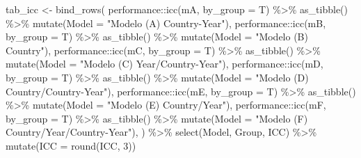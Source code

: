 \documentclass[
  12pt,
  a4paper,
]{article}
\newenvironment{Shaded}{\begin{snugshade}}{\end{snugshade}}
\newcommand{\AttributeTok}[1]{\textcolor[rgb]{0.77,0.63,0.00}{#1}}
\newcommand{\DecValTok}[1]{\textcolor[rgb]{0.00,0.00,0.81}{#1}}
\newcommand{\FunctionTok}[1]{\textcolor[rgb]{0.00,0.00,0.00}{#1}}
\newcommand{\NormalTok}[1]{#1}
\newcommand{\OtherTok}[1]{\textcolor[rgb]{0.56,0.35,0.01}{#1}}
\newcommand{\SpecialCharTok}[1]{\textcolor[rgb]{0.00,0.00,0.00}{#1}}
\newcommand{\StringTok}[1]{\textcolor[rgb]{0.31,0.60,0.02}{#1}}
\begin{document}
\begin{Shaded}
\begin{Highlighting}[]
\NormalTok{tab\_icc }\OtherTok{\textless{}{-}} \FunctionTok{bind\_rows}\NormalTok{(                                                 }
\NormalTok{performance}\SpecialCharTok{::}\FunctionTok{icc}\NormalTok{(mA, }\AttributeTok{by\_group =}\NormalTok{ T) }\SpecialCharTok{\%\textgreater{}\%} 
  \FunctionTok{as\_tibble}\NormalTok{() }\SpecialCharTok{\%\textgreater{}\%} 
  \FunctionTok{mutate}\NormalTok{(}\AttributeTok{Model =} \StringTok{"Modelo (A) Country{-}Year"}\NormalTok{),}
\NormalTok{performance}\SpecialCharTok{::}\FunctionTok{icc}\NormalTok{(mB, }\AttributeTok{by\_group =}\NormalTok{ T) }\SpecialCharTok{\%\textgreater{}\%} 
  \FunctionTok{as\_tibble}\NormalTok{() }\SpecialCharTok{\%\textgreater{}\%} 
  \FunctionTok{mutate}\NormalTok{(}\AttributeTok{Model =}  \StringTok{"Modelo (B) Country"}\NormalTok{),}
\NormalTok{performance}\SpecialCharTok{::}\FunctionTok{icc}\NormalTok{(mC, }\AttributeTok{by\_group =}\NormalTok{ T) }\SpecialCharTok{\%\textgreater{}\%} 
  \FunctionTok{as\_tibble}\NormalTok{() }\SpecialCharTok{\%\textgreater{}\%} 
  \FunctionTok{mutate}\NormalTok{(}\AttributeTok{Model =} \StringTok{"Modelo (C) Year/Country{-}Year"}\NormalTok{),}
\NormalTok{performance}\SpecialCharTok{::}\FunctionTok{icc}\NormalTok{(mD, }\AttributeTok{by\_group =}\NormalTok{ T) }\SpecialCharTok{\%\textgreater{}\%} 
  \FunctionTok{as\_tibble}\NormalTok{() }\SpecialCharTok{\%\textgreater{}\%} 
  \FunctionTok{mutate}\NormalTok{(}\AttributeTok{Model =} \StringTok{"Modelo (D) Country/Country{-}Year"}\NormalTok{),}
\NormalTok{performance}\SpecialCharTok{::}\FunctionTok{icc}\NormalTok{(mE, }\AttributeTok{by\_group =}\NormalTok{ T) }\SpecialCharTok{\%\textgreater{}\%} 
  \FunctionTok{as\_tibble}\NormalTok{() }\SpecialCharTok{\%\textgreater{}\%} 
  \FunctionTok{mutate}\NormalTok{(}\AttributeTok{Model =} \StringTok{"Modelo (E) Country/Year"}\NormalTok{),}
\NormalTok{performance}\SpecialCharTok{::}\FunctionTok{icc}\NormalTok{(mF, }\AttributeTok{by\_group =}\NormalTok{ T) }\SpecialCharTok{\%\textgreater{}\%} 
  \FunctionTok{as\_tibble}\NormalTok{() }\SpecialCharTok{\%\textgreater{}\%} 
  \FunctionTok{mutate}\NormalTok{(}\AttributeTok{Model =} \StringTok{"Modelo (F) Country/Year/Country{-}Year"}\NormalTok{),}
\NormalTok{) }\SpecialCharTok{\%\textgreater{}\%} 
  \FunctionTok{select}\NormalTok{(Model, Group, ICC) }\SpecialCharTok{\%\textgreater{}\%} 
  \FunctionTok{mutate}\NormalTok{(}\AttributeTok{ICC =} \FunctionTok{round}\NormalTok{(ICC, }\DecValTok{3}\NormalTok{)) }


\end{Highlighting}
\end{Shaded}
\end{document}
